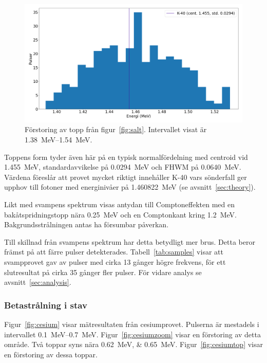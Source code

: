 \begin{figure}[!hp]
    \centering
    \includegraphics[width=\textwidth, keepaspectratio]{../images/salt_top.png}
    \caption{
        Förstoring av topp från figur~\ref{fig:salt}.
        Intervallet visat är \qtyrange{1.38}{1.54}{\MeV}.
    }
    \label{fig:salttop}
\end{figure}

Toppens form tyder även här på en typisk normalfördelning med centroid vid
\qty{1.455}{\MeV}, standardavvikelse på \qty{0.0294}{\MeV} och FHWM på
\qty{0.0640}{\MeV}. Värdena föreslår att provet mycket riktigt innehåller K-40
vars sönderfall ger upphov till fotoner med energinivåer på
\qty{1.460822}{\MeV} (se avsnitt~\ref{sec:theory}).

Likt med svampens spektrum visas antydan till Comptoneffekten med en
bakåtspridningstopp nära \qty{0.25}{\MeV} och en Comptonkant kring
\qty{1.2}{\MeV}. Bakgrundsstrålningen antas ha försumbar påverkan.

Till skillnad från svampens spektrum har detta betydligt mer brus. Detta beror
främst på att färre pulser detekterades. Tabell~\ref{tab:samples} visar att
svampprovet gav av pulser med cirka \num{13} gånger högre frekvens, för ett
slutresultat på cirka \num{35} gånger fler pulser. För vidare analys se
avsnitt~\ref{sec:analysis}.

\subsubsection{Betastrålning i stav} \label{sec:cesium}

Figur~\ref{fig:cesium} visar mätresultaten från cesiumprovet. Pulserna är
mestadels i intervallet \qtyrange{0.1}{0.7}{\MeV}. Figur~\ref{fig:cesiumzoom}
visar en förstoring av detta område. Två toppar syns nära
\qtylist{0.62;0.65}{\MeV}. Figur~\ref{fig:cesiumtop} visar en förstoring av
dessa toppar.

